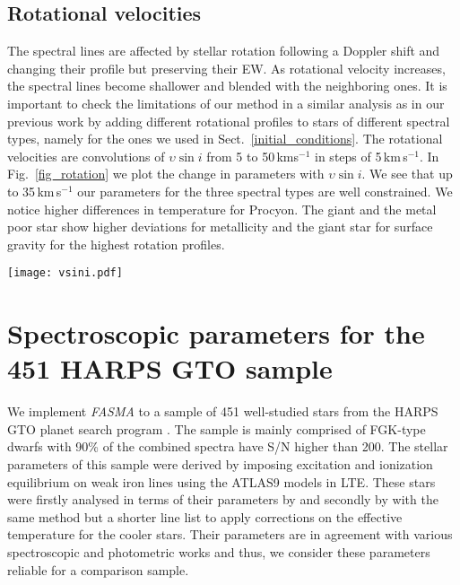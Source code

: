 \documentclass[fleqn,usenatbib]{mnras}
\begin{document}
\subsection{Rotational velocities}\label{rotation}
 
The spectral lines are affected by stellar rotation following a Doppler shift and changing their profile but preserving their EW. As rotational velocity increases, the 
spectral lines become shallower and blended with the neighboring ones. It is important to check the limitations of our method in a similar analysis as in our previous work
by adding different rotational profiles to stars of different spectral types, namely for the ones we used in Sect.~\ref{initial_conditions}. 
The rotational velocities are convolutions of $\upsilon  \sin i$ from 5 to 50\,kms$^{-1}$ in steps of 5\,km\,s$^{-1}$. In Fig.~\ref{fig_rotation} we plot the change in parameters with 
$\upsilon  \sin i$. We see that up to 35\,km\,s$^{-1}$ our parameters for the three spectral types are well constrained. We notice higher differences in temperature for Procyon. 
The giant and the metal poor star show higher deviations for metallicity and the giant star for surface gravity for the highest rotation profiles.

\begin{figure*}
  \centering
   \texttt{[image: vsini.pdf]}
  \caption{Change in stellar parameters by adding different rotational profiles with increment of 5\,km\,s$^{-1}$ for five different reference stars.}
  \label{fig_rotation}
  \end{figure*}

\section{Spectroscopic parameters for the 451 HARPS GTO sample}\label{451_results}
 
We implement \textit{FASMA} to a sample of 451 well-studied stars from the HARPS GTO planet search program \citep{mayor2003}. The sample is mainly comprised of FGK-type dwarfs with 
90\% of the combined spectra have S/N higher than 200. The stellar parameters of this sample were derived by imposing excitation and 
ionization equilibrium on weak iron lines using the ATLAS9 models in LTE. These stars were firstly analysed in terms of their parameters by \cite{sousa2008} 
and secondly by \cite{tsantaki13} with the same method but a shorter line list to apply corrections on the effective temperature for the cooler stars. Their parameters are in agreement with 
various spectroscopic and photometric works and thus, we consider these parameters reliable for a comparison sample.
 
\end{document}
